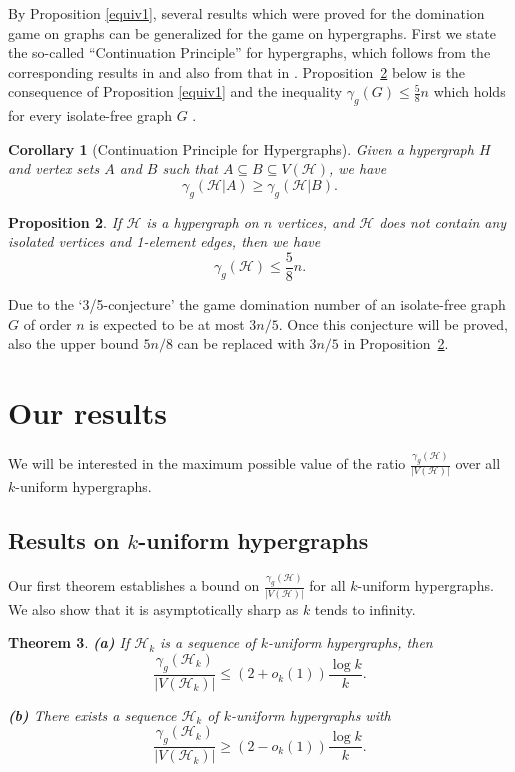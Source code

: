 \documentclass[12pt]{article}
\newtheorem{theorem}{Theorem}[section]
\newtheorem{corollary}[theorem]{Corollary}
\newtheorem{prop}[theorem]{Proposition}
\newcommand\cH{{\mathcal H}}
\begin{document}
By Proposition \ref{equiv1}, several results which were proved for the domination game on graphs can be generalized for the game on hypergraphs. First we state the so-called ``Continuation Principle'' for hypergraphs, which follows from the corresponding results in \cite{KWZ} and also from that in  \cite{BHT3}. Proposition~\ref{5/8} below is the consequence of Proposition \ref{equiv1} and the inequality $\gamma_g(G)\le \frac{5}{8}n$ which holds for every isolate-free graph $G$ \cite{B2017+}.




\begin{corollary}[Continuation Principle for Hypergraphs]
Given a hypergraph $H$ and vertex sets $A$ and $B$ such that $A\subseteq B\subseteq  V(\cH)$, we have $$\gamma_g(\cH|A) \ge \gamma_g(\cH|B).$$
\end{corollary}
 
\begin{prop}\label{5/8}
If $\cH$ is a hypergraph on $n$ vertices, and $\cH$ does not contain any isolated vertices and 1-element edges, then we have
$$\gamma_g(\cH)\le \frac{5}{8}n.$$
\end{prop}
Due to the `3/5-conjecture' \cite{KWZ} the game domination number of an isolate-free graph $G$ of order $n$ is expected to be at most $3n/5$. Once this conjecture will be proved, also the upper bound $5n/8$ can be replaced with $3n/5$ in Proposition~\ref{5/8}.

\section{Our results}

We will be interested in the maximum possible value of the ratio $\frac{\gamma_g(\cH)}{|V(\cH)|}$ over all $k$-uniform hypergraphs.

\subsection*{Results on $k$-uniform hypergraphs}

Our first theorem establishes a bound on $\frac{\gamma_g(\cH)}{|V(\cH)|}$ for all $k$-uniform hypergraphs. We also show that it is asymptotically sharp as $k$ tends to infinity.

\begin{theorem}\label{gdkunif}
\textbf{(a)} If $\cH_k$ is a sequence of $k$-uniform hypergraphs, then $$\frac{\gamma_g(\cH_k)}{|V(\cH_k)|}\le (2+o_k(1))\frac{\log k}{k}.$$

\textbf{(b)} There exists a sequence $\cH_k$ of $k$-uniform hypergraphs with $$\frac{\gamma_g(\cH_k)}{|V(\cH_k)|}\ge (2-o_k(1))\frac{\log k}{k}.$$
\end{theorem}
\end{document}
